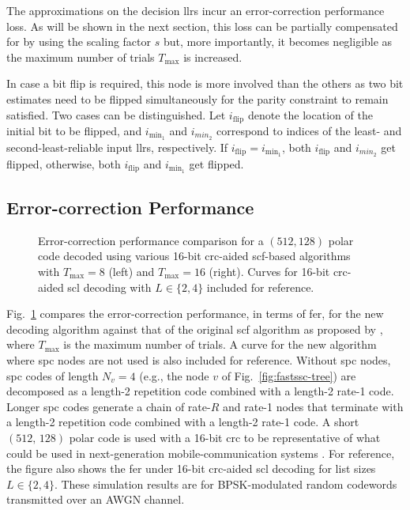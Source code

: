 \documentclass[conference]{IEEEtran}
\begin{document}
The approximations on the decision \glspl{llr} incur an error-correction performance loss. As will be shown in the next section, this loss can be partially compensated for by using the scaling factor $s$ but, more importantly, it becomes negligible as the maximum number of trials $T_{\max}$ is increased. 

In case a bit flip is required, this node is more involved than the others as two bit estimates need to be flipped simultaneously for the parity constraint to remain satisfied. Two cases can be distinguished. Let $i_{\text{flip}}$ denote the location of the initial bit to be flipped, and $i_{\min_1}$ and $i_{min_2}$ correspond to indices of the least- and second-least-reliable input \glspl{llr}, respectively. If $i_{\text{flip}}=i_{\min_1}$, both $i_{\text{flip}}$ and $i_{min_2}$ get flipped, otherwise, both $i_{\text{flip}}$ and $i_{\min_1}$ get flipped.

\subsection{Error-correction Performance}

\begin{figure}[t]
	\centering
	\vspace{-6pt}
	\caption{Error-correction performance comparison for a $(512, 128)$ polar code decoded using various 16-bit \gls{crc}-aided \gls{scf}-based algorithms with $T_{\max}=8$ (left) and $T_{\max}=16$ (right). Curves for 16-bit \gls{crc}-aided \gls{scl} decoding with $L \in \{2,4\}$ included for reference.}
	\label{fig:ec-perf-cmp-flip}\vspace{-10pt}
\end{figure}

Fig.~\ref{fig:ec-perf-cmp-flip} compares the error-correction performance, in terms of \gls{fer}, for the new decoding algorithm against that of the original \gls{scf} algorithm as proposed by \cite{Afisiadis2014}, where $T_{\max}$ is the maximum number of trials.
A curve for the new algorithm where \gls{spc} nodes are not used is also included for reference. Without \gls{spc} nodes, \gls{spc} codes of length $N_v=4$ (e.g., the node $v$ of Fig.~\ref{fig:fastssc-tree}) are decomposed as a length-2 repetition code combined with a length-2 rate-1 code. Longer \gls{spc} codes generate a chain of rate-$R$ and rate-1 nodes that terminate with a length-2 repetition code combined with a length-2 rate-1 code.
A short $(512,\,128)$ polar code is used with a 16-bit \gls{crc} to be representative of what could be used in next-generation mobile-communication systems \cite{3GPPRANPolar}.
For reference, the figure also shows the \gls{fer} under 16-bit \gls{crc}-aided \gls{scl} decoding for list sizes $L\in\{2,4\}$.
These simulation results are for BPSK-modulated random codewords transmitted over an AWGN channel.
\end{document}
